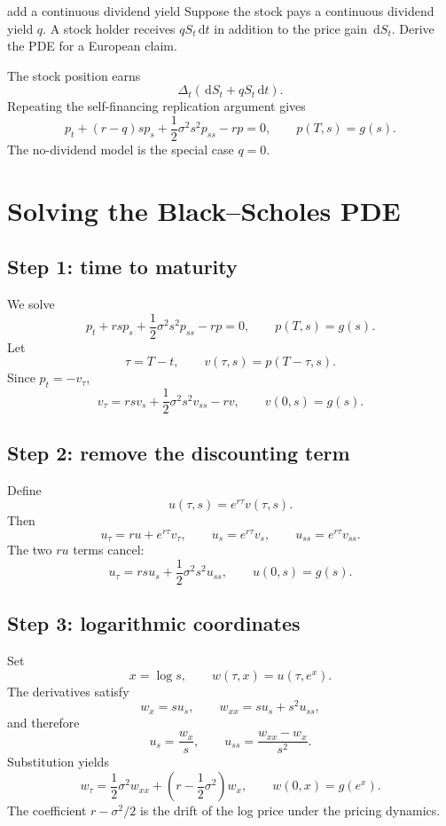 \documentclass[10pt]{article}
\newcommand{\1}{\mathbf 1}
\newcommand{\dd}{\,\mathrm d}
\theoremstyle{definition}
\begin{document}
\begin{studentexercise}{add a continuous dividend yield}
Suppose the stock pays a continuous dividend yield \(q\). A stock holder
receives \(qS_t\dd t\) in addition to the price gain \(\dd S_t\). Derive the
PDE for a European claim.
\end{studentexercise}
\begin{shortsolution}
The stock position earns
\[
\Delta_t(\dd S_t+qS_t\dd t).
\]
Repeating the self-financing replication argument gives
\[
\boxed{
p_t+(r-q)sp_s+\frac12\sigma^2s^2p_{ss}-rp=0,
\qquad p(T,s)=g(s).}
\]
The no-dividend model is the special case \(q=0\).
\end{shortsolution}

\section{Solving the Black--Scholes PDE}

\subsection{Step 1: time to maturity}

We solve
\[
p_t+rsp_s+\frac12\sigma^2s^2p_{ss}-rp=0,
\qquad p(T,s)=g(s).
\]
Let
\[
\tau=T-t,
\qquad
v(\tau,s)=p(T-\tau,s).
\]
Since \(p_t=-v_\tau\),
\[
\boxed{
v_\tau
=rsv_s+\frac12\sigma^2s^2v_{ss}-rv,
\qquad
v(0,s)=g(s).}
\]

\subsection{Step 2: remove the discounting term}

Define
\[
u(\tau,s)=e^{r\tau}v(\tau,s).
\]
Then
\[
u_\tau=ru+e^{r\tau}v_\tau,\qquad
u_s=e^{r\tau}v_s,\qquad
u_{ss}=e^{r\tau}v_{ss}.
\]
The two \(r u\) terms cancel:
\[
\boxed{
u_\tau
=rsu_s+\frac12\sigma^2s^2u_{ss},
\qquad
u(0,s)=g(s).}
\]

\subsection{Step 3: logarithmic coordinates}

Set
\[
x=\log s,
\qquad
w(\tau,x)=u(\tau,e^x).
\]
The derivatives satisfy
\[
w_x=su_s,\qquad
w_{xx}=su_s+s^2u_{ss},
\]
and therefore
\[
u_s=\frac{w_x}{s},
\qquad
u_{ss}=\frac{w_{xx}-w_x}{s^2}.
\]
Substitution yields
\[
\boxed{
w_\tau
=\frac12\sigma^2w_{xx}
+\left(r-\frac12\sigma^2\right)w_x,
\qquad
w(0,x)=g(e^x).}
\]
The coefficient \(r-\sigma^2/2\) is the drift of the log price under the
pricing dynamics.
\end{document}
